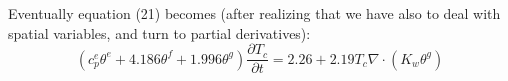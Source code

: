 Eventually equation (21) becomes (after realizing that we have also to deal with spatial variables, and turn to partial derivatives):
\begin{equation}
(c_p^e \theta^e + 4.186 \theta^f + 1.996 \theta^g) \frac{\partial T_c}{\partial t} = 2.26 + 2.19 T_c \nabla \cdot ( K_w  \theta^g)
\end{equation}